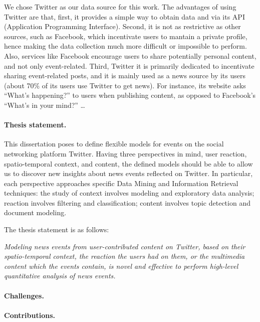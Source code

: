 \begin{intro}
We chose Twitter as our data source for this work. 
%
The advantages of using Twitter are that, first, it provides a simple way to
obtain data and via its API (Application Programming Interface).
%
Second, it is not as restrictive as other sources, such as Facebook, which
incentivate users to mantain a private profile, hence making the data collection
much more difficult or impossible to perform.
%
Also, services like Facebook encourage users to share potentially personal
content, and not only event-related.
%
Third, Twitter it is primarily dedicated to incentivate sharing event-related
posts, and it is mainly used as a news source by its users (about 70\% of its
users use Twitter to get news). 
%
For instance, its website asks “What’s happening?” to users when publishing
content, as opposed to Facebook’s “What’s in your mind?”
%
\dots




\paragraph{Thesis statement.} 
%
This dissertation poses to define flexible models for events on the social
networking platform Twitter. 
%
Having three perspectives in mind, user reaction, spatio-temporal context, and
content, the defined models should be able to allow us to discover new insights
about news events reflected on Twitter. 
%
In particular, each perspective approaches specific Data Mining and Information
Retrieval techniques: 
%
the study of context involves modeling and exploratory data analysis; 
%
reaction involves filtering and classification;
%
content involves topic detection and document modeling.


The thesis statement is as follows:

\begin{center}
{\em
Modeling news events from user-contributed content on Twitter, based on
their spatio-temporal context, the reaction the users had on them, or the
multimedia content which the events contain, is novel and effective to perform
high-level quantitative analysis of news events.
}
\end{center}



\paragraph{Challenges.}




\paragraph{Contributions.}


\end{intro}
